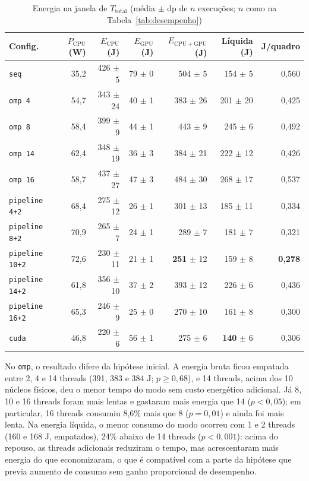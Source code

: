 \documentclass[12pt]{article}
\begin{document}
\begin{table}[ht]
\centering
\small
\caption{Energia na janela de $T_{\mathrm{total}}$ (média $\pm$ dp de $n$
execuções; $n$ como na Tabela~\ref{tab:desempenho})}
\label{tab:energia}
\begin{tabular}{lrrrrrr}
\hline
\textbf{Config.} & \textbf{$P_{\mathrm{CPU}}$ (W)} & \textbf{$E_{\mathrm{CPU}}$ (J)} &
\textbf{$E_{\mathrm{GPU}}$ (J)} & \textbf{$E_{\mathrm{CPU+GPU}}$ (J)} &
\textbf{Líquida (J)} & \textbf{J/quadro} \\
\hline
\texttt{seq}           & 35,2 & 426 $\pm$ 5  & 79 $\pm$ 0 & 504 $\pm$ 5  & 154 $\pm$ 5  & 0,560 \\
\texttt{omp 4}         & 54,7 & 343 $\pm$ 24 & 40 $\pm$ 1 & 383 $\pm$ 26 & 201 $\pm$ 20 & 0,425 \\
\texttt{omp 8}         & 58,4 & 399 $\pm$ 9  & 44 $\pm$ 1 & 443 $\pm$ 9  & 245 $\pm$ 6  & 0,492 \\
\texttt{omp 14}        & 62,4 & 348 $\pm$ 19 & 36 $\pm$ 3 & 384 $\pm$ 21 & 222 $\pm$ 12 & 0,426 \\
\texttt{omp 16}        & 58,7 & 437 $\pm$ 27 & 47 $\pm$ 3 & 484 $\pm$ 30 & 268 $\pm$ 17 & 0,537 \\
\texttt{pipeline 4+2}  & 68,4 & 275 $\pm$ 12 & 26 $\pm$ 1 & 301 $\pm$ 13 & 185 $\pm$ 11 & 0,334 \\
\texttt{pipeline 8+2}  & 70,9 & 265 $\pm$ 7  & 24 $\pm$ 1 & 289 $\pm$ 7  & 181 $\pm$ 7  & 0,321 \\
\texttt{pipeline 10+2} & 72,6 & 230 $\pm$ 11 & 21 $\pm$ 1 & \textbf{251} $\pm$ 12 & 159 $\pm$ 8 & \textbf{0,278} \\
\texttt{pipeline 14+2} & 61,8 & 356 $\pm$ 10 & 37 $\pm$ 2 & 393 $\pm$ 12 & 226 $\pm$ 6  & 0,436 \\
\texttt{pipeline 16+2} & 65,3 & 246 $\pm$ 9  & 25 $\pm$ 0 & 270 $\pm$ 10 & 161 $\pm$ 8  & 0,300 \\
\texttt{cuda}          & 46,8 & 220 $\pm$ 6  & 56 $\pm$ 1 & 275 $\pm$ 6  & \textbf{140} $\pm$ 6 & 0,306 \\
\hline
\end{tabular}
\end{table}

No \texttt{omp}, o resultado difere da hipótese inicial. A energia bruta ficou
empatada entre 2, 4 e 14 threads (391, 383 e 384 J; $p \geq 0{,}68$), e 14
threads, acima dos 10 núcleos físicos, deu o menor tempo do modo sem custo
energético adicional. Já 8, 10 e 16 threads foram mais lentas e gastaram mais
energia que 14 ($p < 0{,}05$); em particular, 16 threads consumiu 8,6\% mais que
8 ($p = 0{,}01$) e ainda foi mais lenta. Na energia líquida, o menor consumo do
modo ocorreu com 1 e 2 threads (160 e 168 J, empatados), 24\% abaixo de 14
threads ($p < 0{,}001$): acima do repouso, as threads adicionais reduziram o
tempo, mas acrescentaram mais energia do que economizaram, o que é compatível
com a parte da hipótese que previa aumento de consumo sem ganho proporcional de
desempenho.
\end{document}
